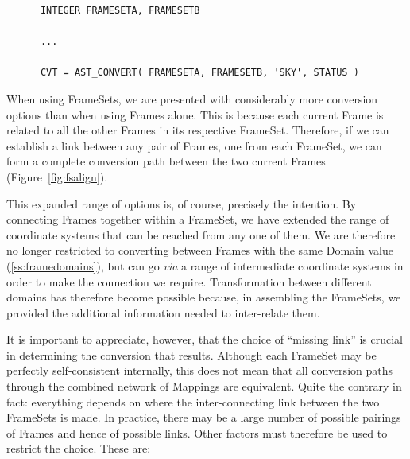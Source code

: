 \documentclass[twoside,11pt]{article}
\newcommand{\secref}[1]{\S\ref{#1}}
\renewcommand{\secref}[1]{\ref{#1}}
\begin{document}
\small
\begin{verbatim}
      INTEGER FRAMESETA, FRAMESETB

      ...

      CVT = AST_CONVERT( FRAMESETA, FRAMESETB, 'SKY', STATUS )
\end{verbatim}
\normalsize

When using FrameSets, we are presented with considerably more
conversion options than when using Frames alone. This is because each
current Frame is related to all the other Frames in its respective
FrameSet. Therefore, if we can establish a link between any pair of
Frames, one from each FrameSet, we can form a complete conversion path
between the two current Frames (Figure~\ref{fig:fsalign}).

This expanded range of options is, of course, precisely the
intention. By connecting Frames together within a FrameSet, we have
extended the range of coordinate systems that can be reached from any
one of them.  We are therefore no longer restricted to converting
between Frames with the same Domain value (\secref{ss:framedomains}),
but can go {\em{via}} a range of intermediate coordinate systems in
order to make the connection we require. Transformation between
different domains has therefore become possible because, in assembling
the FrameSets, we provided the additional information needed to
inter-relate them.

It is important to appreciate, however, that the choice of ``missing
link'' is crucial in determining the conversion that results.
Although each FrameSet may be perfectly self-consistent internally,
this does not mean that all conversion paths through the combined
network of Mappings are equivalent. Quite the contrary in fact:
everything depends on where the inter-connecting link between the two
FrameSets is made.  In practice, there may be a large number of
possible pairings of Frames and hence of possible links. Other factors
must therefore be used to restrict the choice. These are:
\end{document}

